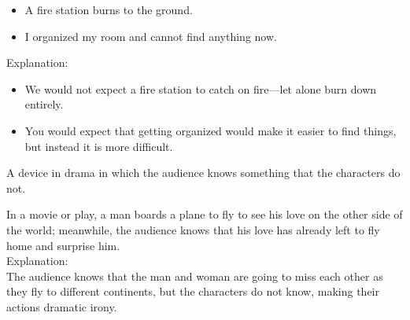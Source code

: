\begin{definition}
    \begin{itemize}
        \item A fire station burns to the ground.
        \item I organized my room and cannot find anything now. \\
    \end{itemize}
    
    Explanation: \\
    
    \begin{itemize}
        \item We would not expect a fire station to catch on fire—let alone
            burn down entirely.
        \item You would expect that getting organized would make it easier to
            find things, but instead it is more difficult.
    \end{itemize}
\end{definition}

\begin{definition}
    A device in drama in which the audience knows something that the characters
    do not.
\end{definition}

\begin{example}
    In a movie or play, a man boards a plane to fly to see his love on the
    other side of the world; meanwhile, the audience knows that his love has
    already left to fly home and surprise him. \\
    
    Explanation: \\
    
    The audience knows that the man and woman are going to miss each other as
    they fly to different continents, but the characters do not know, making
    their actions dramatic irony.
\end{example}
    
\newpage
